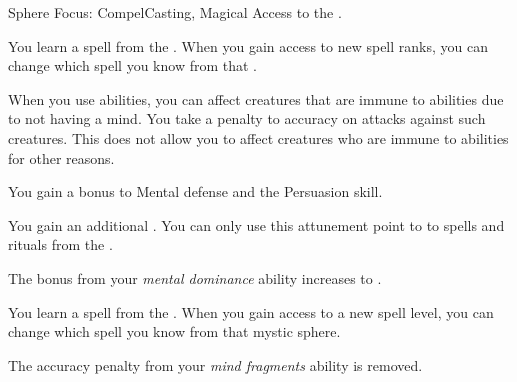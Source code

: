    \begin{feat}{Sphere Focus: Compel}{Casting, Magical}
        \featpre Access to the  .

         You learn a spell from the  .
        When you gain access to new spell ranks, you can change which spell you know from that .

         When you use  abilities, you can affect creatures that are immune to  abilities due to not having a mind.
        You take a  penalty to accuracy on attacks against such creatures.
        This does not allow you to affect creatures who are immune to  abilities for other reasons.

         You gain a  bonus to Mental defense and the Persuasion skill.

         You gain an additional .
        You can only use this attunement point to  to spells and rituals from the  .

         The bonus from your \textit{mental dominance} ability increases to .

         You learn a spell from the  .
        When you gain access to a new spell level, you can change which spell you know from that mystic sphere.

         The accuracy penalty from your \textit{mind fragments} ability is removed.
    \end{feat}

